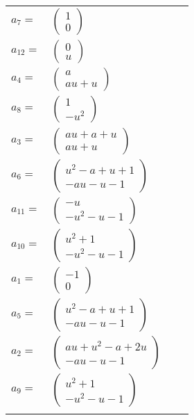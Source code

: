 \documentclass[1p]{elsarticle_modified}
\theoremstyle{definition}
\begin{document}
\begin{tabular}{m{7pt} m{180pt} m{7pt} m{180pt} }
\flushright $a_{7}=$&$\begin{pmatrix}1\\0\end{pmatrix}$ \\
\flushright $a_{12}=$&$\begin{pmatrix}0\\u\end{pmatrix}$ \\
\flushright $a_{4}=$&$\begin{pmatrix}a\\a u+u\end{pmatrix}$ \\
\flushright $a_{8}=$&$\begin{pmatrix}1\\- u^2\end{pmatrix}$ \\
\flushright $a_{3}=$&$\begin{pmatrix}a u+a+u\\a u+u\end{pmatrix}$ \\
\flushright $a_{6}=$&$\begin{pmatrix}u^2- a+u+1\\- a u- u-1\end{pmatrix}$ \\
\flushright $a_{11}=$&$\begin{pmatrix}- u\\- u^2- u-1\end{pmatrix}$ \\
\flushright $a_{10}=$&$\begin{pmatrix}u^2+1\\- u^2- u-1\end{pmatrix}$ \\
\flushright $a_{1}=$&$\begin{pmatrix}-1\\0\end{pmatrix}$ \\
\flushright $a_{5}=$&$\begin{pmatrix}u^2- a+u+1\\- a u- u-1\end{pmatrix}$ \\
\flushright $a_{2}=$&$\begin{pmatrix}a u+u^2- a+2 u\\- a u- u-1\end{pmatrix}$ \\
\flushright $a_{9}=$&$\begin{pmatrix}u^2+1\\- u^2- u-1\end{pmatrix}$\\&\end{tabular}
\end{document}
